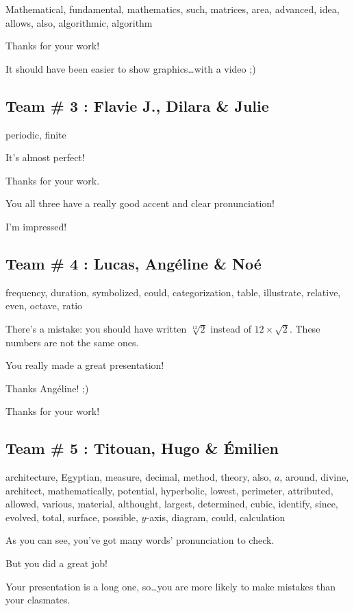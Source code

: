 \documentclass[12pt,oneside]{report}
\begin{document}
\begin{spacing}{1.2}
Mathematical, fundamental, mathematics, such, matrices, area, advanced, idea, allows, also, algorithmic, algorithm

\color{blue}
Thanks for your work!

It should have been easier to show graphics\dots with a video ;)
\color{black}

\subsection*{Team \# 3 : Flavie J., Dilara \& Julie}

periodic, finite

\color{blue}
It's almost perfect!

Thanks for your work.

You all three have a really good accent and clear pronunciation!

I'm impressed!
\color{black}

\subsection*{Team \# 4 : Lucas, Angéline \& Noé}

frequency, duration, symbolized, could, categorization, table, illustrate, relative, even, octave, ratio

\color{blue}
There's a mistake: you should have written $\sqrt[12]{2}$ instead of $12\times \sqrt{2}$. These numbers are not the same ones.

You really made a great presentation!

Thanks Angéline! ;)

Thanks for your work!
\color{black}

\subsection*{Team \# 5 : Titouan, Hugo \& Émilien}

architecture, Egyptian, measure, decimal, method, theory, also, $a$, around, divine, architect, mathematically, potential, hyperbolic, lowest, perimeter, attributed, allowed, various, material, althought, largest, determined, cubic, identify, since, evolved, total, surface, possible, $y$-axis, diagram, could, calculation

\color{blue}
As you can see, you've got many words' pronunciation to check.

But you did a great job!

Your presentation is a long one, so\dots you are more likely to make mistakes than your clasmates.
\color{black}


\end{spacing}
\end{document}
